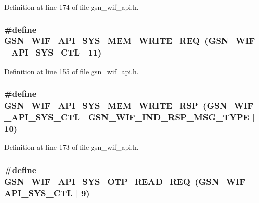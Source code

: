 Definition at line 174 of file gsn\_\-wif\_\-api.h.

\hypertarget{a00606_a60e546c898b2b9fa3f373311b2edd6a0}{
\subsubsection[{GSN\_\-WIF\_\-API\_\-SYS\_\-MEM\_\-WRITE\_\-REQ}]{\setlength{\rightskip}{0pt plus 5cm}\#define GSN\_\-WIF\_\-API\_\-SYS\_\-MEM\_\-WRITE\_\-REQ~(GSN\_\-WIF\_\-API\_\-SYS\_\-CTL $|$ 11)}}
\label{a00606_a60e546c898b2b9fa3f373311b2edd6a0}


Definition at line 155 of file gsn\_\-wif\_\-api.h.

\hypertarget{a00606_a697f00db1242d9669dad03f339dee38a}{
\subsubsection[{GSN\_\-WIF\_\-API\_\-SYS\_\-MEM\_\-WRITE\_\-RSP}]{\setlength{\rightskip}{0pt plus 5cm}\#define GSN\_\-WIF\_\-API\_\-SYS\_\-MEM\_\-WRITE\_\-RSP~(GSN\_\-WIF\_\-API\_\-SYS\_\-CTL $|$ GSN\_\-WIF\_\-IND\_\-RSP\_\-MSG\_\-TYPE $|$ 10)}}
\label{a00606_a697f00db1242d9669dad03f339dee38a}


Definition at line 173 of file gsn\_\-wif\_\-api.h.

\hypertarget{a00606_a9e43ea4cb7108ce9d5ff1eb0e3623f58}{
\subsubsection[{GSN\_\-WIF\_\-API\_\-SYS\_\-OTP\_\-READ\_\-REQ}]{\setlength{\rightskip}{0pt plus 5cm}\#define GSN\_\-WIF\_\-API\_\-SYS\_\-OTP\_\-READ\_\-REQ~(GSN\_\-WIF\_\-API\_\-SYS\_\-CTL $|$ 9)}}
\label{a00606_a9e43ea4cb7108ce9d5ff1eb0e3623f58}


